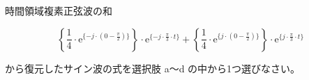 時間領域複素正弦波の和

\[
\left \{ \frac{1}{4} \cdot \textrm{e}^{\{-j \cdot (0 - \frac{\pi}{2}) \}} \right \} \cdot \textrm{e}^{\{-j \cdot \frac{\pi}{3} \cdot t \}} +  
\left \{ \frac{1}{4} \cdot \textrm{e}^{\{ j \cdot (0 - \frac{\pi}{2}) \}} \right \} \cdot \textrm{e}^{\{ j \cdot \frac{\pi}{3} \cdot t \}}
\]

\bigskip
\noindent から復元したサイン波の式を選択肢 a〜d の中から1つ選びなさい。
